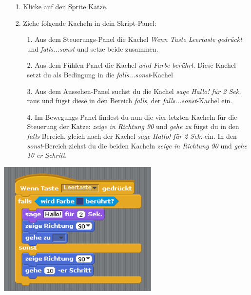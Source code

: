 \begin{itemize}
\item[1. ] Klicke auf den Sprite Katze.
\item[2. ] Ziehe folgende Kacheln in dein Skript-Panel:
  \begin{itemize}
  \item[1. ] Aus dem Steuerungs-Panel die Kachel \textit{Wenn Taste Leertaste gedrückt} und \textit{falls...sonst} und setze beide zusammen.
  \item[2. ] Aus dem Fühlen-Panel die Kachel \textit{wird Farbe berührt}. Diese Kachel setzt du als Bedingung in die \textit{falls...sonst}-Kachel
  \item[3. ] Aus dem Aussehen-Panel suchst du die Kachel \textit{sage Hallo! für 2 Sek.} raus und fügst diese in den Bereich \textit{falls}, der \textit{falls...sonst}-Kachel ein.
  \item[4. ] Im Bewegungs-Panel findest du nun die vier letzten Kacheln für die Steuerung der Katze: \textit{zeige in Richtung 90} und \textit{gehe zu} fügst du in den \textit{falls}-Bereich, gleich nach der Kachel \textit{sage Hallo! für 2 Sek.} ein. In den \textit{sonst}-Bereich ziehst du die beiden Kacheln \textit{zeige in Richtung 90} und \textit{gehe 10-er Schritt}.
  \end{itemize}
\end{itemize}
\includegraphics[width=0.6\textwidth]{images/aufgabe4_katze_bewegung_default.png}
